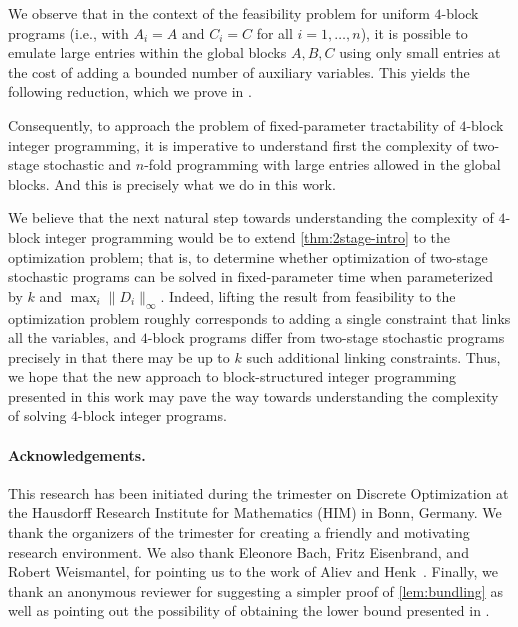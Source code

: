 \documentclass{article}
\makeatletter
\newcommand{\Oh}{{\mathcal{O}}}
\newcommand\IfRestateTF{%
  \ifx\label\thmt@gobble@label %
    \expandafter\@firstoftwo
  \else
    \expandafter\@secondoftwo
  \fi
}
\newcommand{\RestateRemark}{\IfRestateTF{{\normalfont\bfseries (Restated) }}{}}
\makeatother
\begin{document}
We observe that in the context of the feasibility problem for uniform $4$-block programs (i.e., with $A_i=A$ and $C_i=C$ for all $i=1,\ldots,n$), it is possible to emulate large entries within the global blocks $A,B,C$ using only small entries at the cost of adding a bounded number of auxiliary variables. This yields the following reduction, which we prove in .


Consequently, to approach the problem of fixed-parameter tractability of $4$-block integer programming, it is imperative to understand first the complexity of two-stage stochastic and $n$-fold programming with large entries allowed in the global blocks. And this is precisely what we do in this work.

We believe that the next natural step towards understanding the complexity of $4$-block integer programming would be to extend \cref{thm:2stage-intro} to the optimization problem; that is, to determine whether optimization of two-stage stochastic programs can be solved in fixed-parameter time when parameterized by $k$ and $\max_i \|D_i\|_\infty$. Indeed, lifting the result from feasibility to the optimization problem roughly corresponds to adding a single constraint that links all the variables, and $4$-block programs differ from two-stage stochastic programs precisely in that there may be up to $k$ such additional linking constraints. Thus, we hope that the  new approach to block-structured integer programming presented in this work may pave the way towards understanding the complexity of solving $4$-block integer programs.

\paragraph*{Acknowledgements.} This research has been initiated during the trimester on Discrete Optimization at the Hausdorff Research Institute for Mathematics (HIM) in Bonn, Germany. We thank the organizers of the trimester for creating a friendly and motivating research environment. We also thank Eleonore Bach, Fritz Eisenbrand, and Robert Weismantel, for pointing us to the work of Aliev and Henk~\cite{AlievH10}. Finally, we thank an anonymous reviewer for suggesting a simpler proof of \cref{lem:bundling} as well as pointing out the possibility of obtaining the lower bound presented in .
\end{document}
